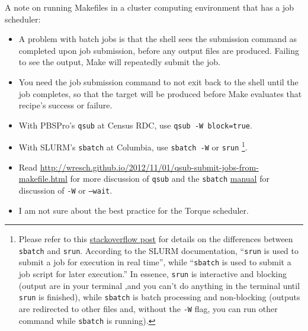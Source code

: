 A note on running Makefiles in a cluster computing environment that has a job scheduler:
\begin{itemize}
	\item A problem with batch jobs is that the shell sees the submission command as completed upon job submission, before any output files are produced.
	Failing to see the output, Make will repeatedly submit the job.
	\item You need the job submission command to not exit back to the shell until the job completes, so that the target will be produced before Make evaluates that recipe's success or failure.
	\item With PBSPro's \texttt{qsub} at Census RDC, use \texttt{qsub -W block=true}.
	\item With SLURM's \texttt{sbatch} at Columbia, use \texttt{sbatch -W} or \texttt{srun}%
		\footnote{
			Please refer to this \href{https://stackoverflow.com/questions/43767866/slurm-srun-vs-sbatch-and-their-parameters}{stackoverflow post}
				for details on the differences
				between \texttt{sbatch} and \texttt{srun}.
			According to the SLURM documentation,
				``\texttt{srun} is used to submit a job for execution in real time'',
				while ``\texttt{sbatch} is used to submit a job script for later execution.''
			In essence, \texttt{srun} is interactive and blocking
				(output are in your terminal ,and
				you can't do anything in the terminal until \texttt{srun} is finished),
				while \texttt{sbatch} is batch processing and non-blocking
				(outputs are redirected to other files and,
				without the \texttt{-W} flag,
				you can run other command while \texttt{sbatch} is running).
		}.
	\item Read \url{http://wresch.github.io/2012/11/01/qsub-submit-jobs-from-makefile.html} for more discussion of \texttt{qsub} and the \texttt{sbatch} \href{https://slurm.schedmd.com/sbatch.html}{manual} for discussion of \texttt{-W} or \texttt{--wait}.
	\item I am not sure about the best practice for the Torque scheduler.
\end{itemize}

